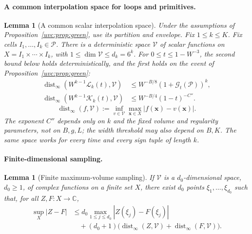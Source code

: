 \documentclass[11pt]{article}
\numberwithin{equation}{section}
\newtheorem{lemma}[theorem]{Lemma}
\theoremstyle{remark}
\newcommand{\C}{\mathbb C}
\newcommand{\cL}{\mathcal L}
\newcommand{\cK}{\mathcal K}
\begin{document}
\paragraph{A common interpolation space for loops and primitives.}
\begin{lemma}[A common scalar interpolation space]\label{uvc:lem:space}
Under the assumptions of Proposition~\ref{uvc:prop:green}, use its
partition and envelope. Fix $1\le k\le K$.
Fix cells $I_1,\ldots,I_k\in\mathcal P$. There is a deterministic
space $\mathcal V$ of scalar functions on $X=I_1\times\cdots\times I_k$, with
$1\le\dim\mathcal V\le d_k=6^k$.
For $0\le t\le1-W^{-3}$, the second bound below holds deterministically,
and the first holds on the event of Proposition~\ref{uvc:prop:green}:
\begin{equation}\label{uvc:eq:common-space-errors}
 \begin{aligned}
 \operatorname{dist}_{\infty}(W^{k-1}\cL_k(t),\mathcal V)
 &\le W^{-B/8}(1+\mathcal G_t(\mathcal P))^k,\\
 \operatorname{dist}_{\infty}(W^{k-1}\cK_k(t),\mathcal V)
 &\le W^{-B/4}(1-t)^{-C''}.
 \end{aligned}
\end{equation}
\[
\operatorname{dist}_\infty(f,\mathcal V)
:=\inf_{v\in\mathcal V}\max_{\boldsymbol x\in X}
|f(\boldsymbol x)-v(\boldsymbol x)|.
\]
The exponent $C''$ depends only on $k$ and the fixed volume and
regularity parameters, not on $B,g,L$; the width threshold may also
depend on $B,K$. The same
space works for every time and every sign tuple of length $k$.
\end{lemma}

\paragraph{Finite-dimensional sampling.}
\begin{lemma}[Finite maximum-volume sampling]\label{uvc:lem:fekete}
If $\mathcal V$ is a $d_0$-dimensional space, $d_0\ge1$, of complex functions on
a finite set $X$, there exist $d_0$ points $\xi_1,\ldots,\xi_{d_0}$ such
that, for all $Z,F:X\to\C$,
\begin{equation}\label{uvc:eq:finite-norming}
 \begin{aligned}
 \sup_X|Z-F|&\le d_0\max_{1\le j\le d_0}|Z(\xi_j)-F(\xi_j)|\\
 &\quad +(d_0+1)\bigl(\operatorname{dist}_\infty(Z,\mathcal V)
              +\operatorname{dist}_\infty(F,\mathcal V)\bigr).
 \end{aligned}
\end{equation}
\end{lemma}
\end{document}
